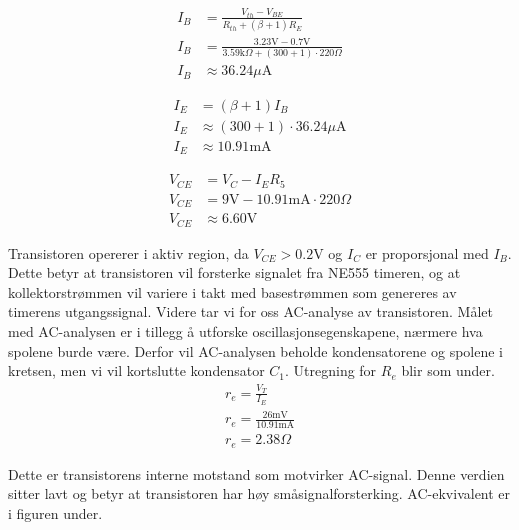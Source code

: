 \begin{center}
\begin{minipage}[t]{0.47\textwidth}
\begin{align*}
I_B &= \frac{V_{th} - V_{BE}}
           {R_{th} + (\beta + 1) R_E} \\
  I_B  &= \frac{3.23\text{V} - 0.7\text{V}}
           {3.59\text{k}\Omega + (300 + 1)\cdot220\Omega} \\
 I_B   &\approx 36.24\mu\text{A}
\end{align*}
\end{minipage}
\hfill
\begin{minipage}[t]{0.47\textwidth}
\begin{align*}
I_E &= (\beta + 1)I_B \\
  I_E  &\approx (300 + 1)\cdot36.24\mu\text{A} \\
  I_E  &\approx 10.91\text{mA}
\end{align*}
\end{minipage}

\vspace{1em}

\begin{align*}
V_{CE} &= V_C - I_E R_5 \\
 V_{CE}      &= 9\text{V} - 10.91\text{mA}\cdot220\Omega \\
  V_{CE}     &\approx 6.60\text{V}
\end{align*}
\end{center}

\noindent
Transistoren opererer i aktiv region, da $V_{CE} > 0.2\text{V}$ og $I_C$ er proporsjonal med $I_B$. Dette betyr at transistoren vil forsterke signalet fra NE555 timeren, og at kollektorstrømmen vil variere i takt med basestrømmen som genereres av timerens utgangssignal. Videre tar vi for oss AC-analyse av transistoren. Målet med AC-analysen er i tillegg å utforske oscillasjonsegenskapene, nærmere hva spolene burde være. Derfor vil AC-analysen beholde kondensatorene og spolene i kretsen, men vi vil kortslutte kondensator $C_1$. Utregning for $R_e$ blir som under. 
\begin{gather*}
    r_e = \frac{V_T}{I_E} \\
    r_e = \frac{26\text{mV}}{10.91\text{mA}} \\
    r_e = 2.38\Omega
\end{gather*}


\noindent
Dette er transistorens interne motstand som motvirker AC-signal. Denne verdien sitter lavt og betyr at transistoren har høy småsignalforsterking. AC-ekvivalent er i figuren under.

